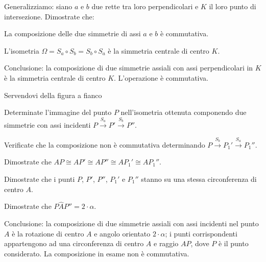 Generalizziamo: siano \(a\) e \(b\) due rette tra loro perpendicolari e 
\(K\) il loro punto di intersezione. Dimostrate che:
\begin{itemize*}
\item La composizione delle due simmetrie di assi \(a\) e \(b\) è 
commutativa.
\item L'isometria \(\Omega = S_a\circ S_b = S_b \circ S_a\) è la 
simmetria centrale di centro \(K\).
\end{itemize*}

Conclusione: la composizione di due simmetrie assiali con assi 
perpendicolari in \(K\) è la simmetria centrale di centro \(K\). 
L'operazione è commutativa.
\pagebreak
\begin{exrig}
\noindent\begin{minipage}{0.6\textwidth}\parindent15pt
\begin{esempio}
Servendovi della figura a fianco
\begin{itemize*}
\item Determinate l'immagine del punto \(P\) nell'isometria ottenuta 
componendo due simmetrie con assi incidenti 
\(P\overset{S_a}\rightarrow P' \overset{S_b}\rightarrow P''\).
\item Verificate che la composizione non è commutativa determinando 
\(P\overset{S_b}\rightarrow P_1' \overset{S_a}\rightarrow P_1''\).
\item Dimostrate che \(AP \cong AP'\cong AP''\cong AP_1' \cong AP_1''\).
\item Dimostrate che i punti \(P\), \(P'\), \(P''\), \(P_1'\) e \(P_1''\) 
stanno su una stessa circonferenza di centro \(A\).
\item Dimostrate che \(P\widehat{A}P''=2\cdot \alpha\).
\end{itemize*}
\end{esempio}
\end{minipage}\hfil
\begin{minipage}{0.4\textwidth}
	\centering
\end{minipage}\vspace{5pt}
\end{exrig}
			
Conclusione: la composizione di due simmetrie assiali con assi 
incidenti nel punto \(A\) è la rotazione di centro \(A\) e angolo 
orientato \(2\cdot \alpha\); i punti corrispondenti appartengono ad una 
circonferenza di centro \(A\) e raggio \(AP\), dove \(P\) è il punto 
considerato. La composizione in esame non è commutativa.
			
